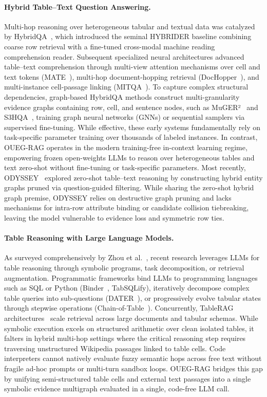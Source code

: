 \documentclass[runningheads]{llncs}
\begin{document}
\paragraph{Hybrid Table--Text Question Answering.}
Multi-hop reasoning over heterogeneous tabular and textual data was catalyzed by HybridQA~\cite{hybridqa}, which introduced the seminal HYBRIDER baseline combining coarse row retrieval with a fine-tuned cross-modal machine reading comprehension reader. Subsequent specialized neural architectures advanced table--text comprehension through multi-view attention mechanisms over cell and text tokens (MATE~\cite{eisenschlos2021mate}), multi-hop document-hopping retrieval (DocHopper~\cite{sun2021dochopper}), and multi-instance cell-passage linking (MITQA~\cite{kumar2021mitqa}). To capture complex structural dependencies, graph-based HybridQA methods construct multi-granularity evidence graphs containing row, cell, and sentence nodes, such as MuGER²~\cite{chen2022muger2} and S3HQA~\cite{lei2023s3hqa}, training graph neural networks (GNNs) or sequential samplers via supervised fine-tuning. While effective, these early systems fundamentally rely on task-specific parameter training over thousands of labeled instances. In contrast, OUEG-RAG operates in the modern training-free in-context learning regime, empowering frozen open-weights LLMs to reason over heterogeneous tables and text zero-shot without fine-tuning or task-specific parameters. Most recently, ODYSSEY~\cite{agarwal2025hybrid} explored zero-shot table--text reasoning by constructing hybrid entity graphs pruned via question-guided filtering. While sharing the zero-shot hybrid graph premise, ODYSSEY relies on destructive graph pruning and lacks mechanisms for intra-row attribute binding or candidate collision tiebreaking, leaving the model vulnerable to evidence loss and symmetric row ties.

\paragraph{Table Reasoning with Large Language Models.}
As surveyed comprehensively by Zhou et al.~\cite{zhou2026tableqasurvey}, recent research leverages LLMs for table reasoning through symbolic programs, task decomposition, or retrieval augmentation. Programmatic frameworks bind LLMs to programming languages such as SQL or Python (Binder~\cite{cheng2023binder}, TabSQLify), iteratively decompose complex table queries into sub-questions (DATER~\cite{ye2023dater}), or progressively evolve tabular states through stepwise operations (Chain-of-Table~\cite{wang2024chainoftable}). Concurrently, TableRAG architectures~\cite{chen2024tablerag,yu2025tablerag} scale retrieval across large documents and tabular schemas. While symbolic execution excels on structured arithmetic over clean isolated tables, it falters in hybrid multi-hop settings where the critical reasoning step requires traversing unstructured Wikipedia passages linked to table cells. Code interpreters cannot natively evaluate fuzzy semantic hops across free text without fragile ad-hoc prompts or multi-turn sandbox loops. OUEG-RAG bridges this gap by unifying semi-structured table cells and external text passages into a single symbolic evidence multigraph evaluated in a single, code-free LLM call.
\end{document}
